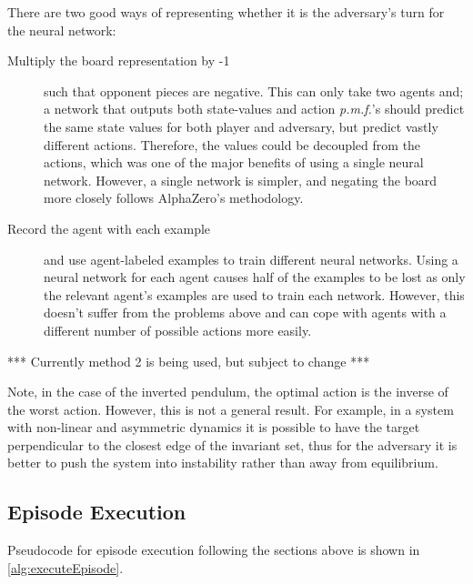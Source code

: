\documentclass[../main.tex]{subfiles}
\begin{document}
There are two good ways of representing whether it is the adversary's turn for the neural network: 
\begin{description}
   \item[Multiply the board representation by -1] such that opponent pieces are negative. This can only take two agents and; a network that outputs both state-values and action \textit{p.m.f.}'s should predict the same state values for both player and adversary, but predict vastly different actions. Therefore, the values could be decoupled from the actions, which was one of the major benefits of using a single neural network. However, a single network is simpler, and negating the board more closely follows AlphaZero's methodology.

   \item[Record the agent with each example] and use agent-labeled examples to train different neural networks. Using a neural network for each agent causes half of the examples to be lost as only the relevant agent's examples are used to train each network. However, this doesn't suffer from the problems above and can cope with agents with a different number of possible actions more easily.
\end{description}

*** Currently method 2 is being used, but subject to change ***

Note, in the case of the inverted pendulum, the optimal action is the inverse of the worst action. However, this is not a general result. For example, in a system with non-linear and asymmetric dynamics it is possible to have the target perpendicular to the closest edge of the invariant set, thus for the adversary it is better to push the system into instability rather than away from equilibrium.

\subsection{Episode Execution}

Pseudocode for episode execution following the sections above is shown in \cref{alg:executeEpisode}.
\end{document}
